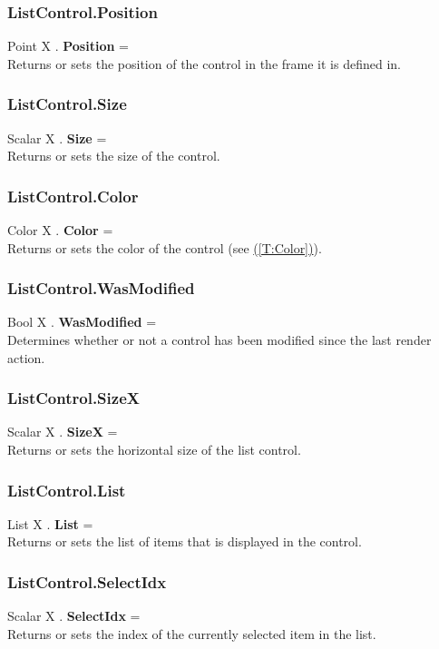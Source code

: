 \documentclass[10pt]{book}
\newcommand{\linkitem}[1]{\hyperref[#1]{\nameref{#1} (\ref{#1})}}
\begin{document}
\subsubsection{ListControl.Position \label{F:ListControl:Position}}
Point X . \textbf{Position} = \\
Returns or sets the position of the control in the frame it is defined in.

\subsubsection{ListControl.Size \label{F:ListControl:Size}}
Scalar X . \textbf{Size} = \\
Returns or sets the size of the control.

\subsubsection{ListControl.Color \label{F:ListControl:Color}}
Color X . \textbf{Color} = \\
Returns or sets the color of the control (see \linkitem{T:Color}).

\subsubsection{ListControl.WasModified \label{F:ListControl:WasModified}}
Bool X . \textbf{WasModified} = \\
Determines whether or not a control has been modified since the last render action.

\subsubsection{ListControl.SizeX \label{F:ListControl:SizeX}}
Scalar X . \textbf{SizeX} = \\
Returns or sets the horizontal size of the list control.

\subsubsection{ListControl.List \label{F:ListControl:List}}
List X . \textbf{List} = \\
Returns or sets the list of items that is displayed in the control.

\subsubsection{ListControl.SelectIdx \label{F:ListControl:SelectIdx}}
Scalar X . \textbf{SelectIdx} = \\
Returns or sets the index of the currently selected item in the list.
\end{document}
